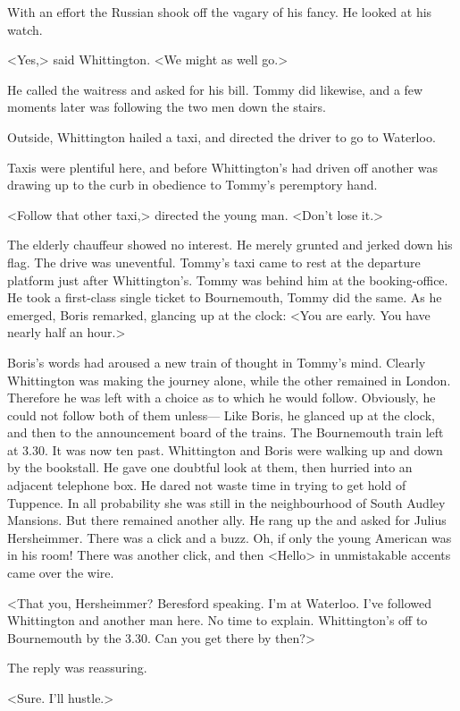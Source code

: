 With an effort the Russian shook off the vagary of his fancy. He looked at his watch.

<Yes,> said Whittington. <We might as well go.>

He called the waitress and asked for his bill. Tommy did likewise, and a few moments later was following the two men down the stairs.

Outside, Whittington hailed a taxi, and directed the driver to go to Waterloo.

Taxis were plentiful here, and before Whittington's had driven off another was drawing up to the curb in obedience to Tommy's peremptory hand.

<Follow that other taxi,> directed the young man. <Don't lose it.>

The elderly chauffeur showed no interest. He merely grunted and jerked down his flag. The drive was uneventful. Tommy's taxi came to rest at the departure platform just after Whittington's. Tommy was behind him at the booking-office. He took a first-class single ticket to Bournemouth, Tommy did the same. As he emerged, Boris remarked, glancing up at the clock: <You are early. You have nearly half an hour.>

Boris's words had aroused a new train of thought in Tommy's mind. Clearly Whittington was making the journey alone, while the other remained in London. Therefore he was left with a choice as to which he would follow. Obviously, he could not follow both of them unless— Like Boris, he glanced up at the clock, and then to the announcement board of the trains. The Bournemouth train left at 3.30. It was now ten past. Whittington and Boris were walking up and down by the bookstall. He gave one doubtful look at them, then hurried into an adjacent telephone box. He dared not waste time in trying to get hold of Tuppence. In all probability she was still in the neighbourhood of South Audley Mansions. But there remained another ally. He rang up the  and asked for Julius Hersheimmer. There was a click and a buzz. Oh, if only the young American was in his room! There was another click, and then <Hello> in unmistakable accents came over the wire.

<That you, Hersheimmer? Beresford speaking. I'm at Waterloo. I've followed Whittington and another man here. No time to explain. Whittington's off to Bournemouth by the 3.30. Can you get there by then?>

The reply was reassuring.

<Sure. I'll hustle.>

